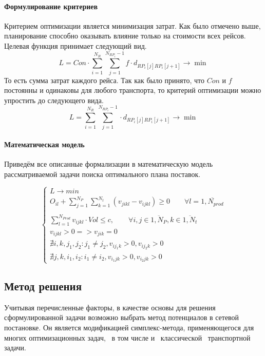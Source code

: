	\paragraph{Формулирование критериев}   
	Критерием оптимизации является минимизация затрат. Как было отмечено выше, планирование способно оказывать влияние только на стоимости всех рейсов. Целевая функция принимает следующий вид.
	\begin{equation}
		L = Con \cdot \sum_{i=1}^{N_R} \sum_{j=1}^{N_{RP_i} - 1} f \cdot d_{RP_i[j] RP_i[j+1]} \to \min
	\end{equation}
	То есть сумма затрат каждого рейса. Так как было принято, что $Con$ и $f$ постоянны и одинаковы для любого транспорта, то критерий оптимизации можно упростить до следующего вида.
	\begin{equation}
		L = \sum_{i=1}^{N_R} \sum_{j=1}^{N_{RP_i} - 1} \cdot d_{RP_i[j] RP_i[j+1]} \to \min
	\end{equation}

	\paragraph{Математическая модель}
	Приведём все описанные формализации в математическую модель рассматриваемой задачи поиска оптимального плана поставок.

	\begin{equation}
	\left\{ \begin{array}{ccc}	
		L \to min \\
		O_{il} + \sum_{j=1}^{N_P} \sum_{k=1}^{N_t} (v_{jikl} - v_{ijkl}) \ge 0 \qquad  \forall l = \overline{1, N_{prod}} \\
		\\
		\sum_{l=1}^{N_{Prod}} v_{ijkl} \cdot Vol \le c, \qquad \forall i, j \in \overline{1, N_P}, k \in \overline{1, N_t} \\
		v_{ijkl} > 0 => v_{jik} = 0 \\
		\nexists i, k, j_1, j_2: j_1 \ne j_2, v_{ij_1k} > 0, v_{ij_2k} > 0 \\
		\nexists j, k, i_1, i_2: i_1 \ne i_2, v_{i_1jk} > 0, v_{i_2jk} > 0 
	\end{array}	\right.
	\end{equation}

\subsection{Метод решения}
	Учитывая перечисленные факторы, в качестве основы для решения сформулированной задачи возможно выбрать метод потенциалов в сетевой постановке. Он является модификацией симплекс-метода, применяющегося для многих оптимизационных задач, \, в том числе и \, классической \, транспортной \, задачи\cite{trans:potential}.
		
